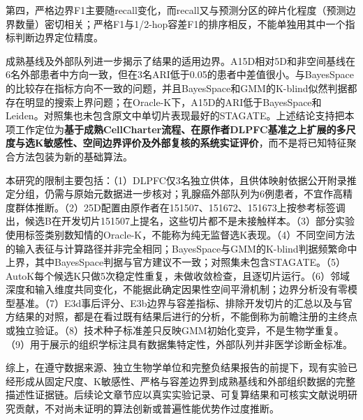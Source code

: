 第四，严格边界F1主要随recall变化，而recall又与预测分区的碎片化程度（预测边界数量）密切相关；严格F1与1/2-hop容差F1的排序相反，不能单独用其中一个指标判断边界定位精度。

成熟基线及外部队列进一步揭示了结果的适用边界。A15D相对5D和非空间基线在6名外部患者中方向一致，但在3名ARI低于0.05的患者中差值很小。与BayesSpace的比较存在指标方向不一致的问题，并且BayesSpace和GMM的K-blind似然判据都存在明显的搜索上界问题；在Oracle-K下，A15D的ARI低于BayesSpace和Leiden。对照集也未包含原文中单切片表现最好的STAGATE。上述结论支持把本项工作定位为\textbf{基于成熟CellCharter流程、在原作者DLPFC基准之上扩展的多尺度与选K敏感性、空间边界评价及外部复核的系统实证评价}，而不是将已知特征聚合方法包装为新的基础算法。

本研究的限制主要包括：（1）DLPFC仅3名独立供体，且供体映射依据公开附录推定分组，仍需与原始元数据进一步核对；乳腺癌外部队列为6例患者，不宜作高精度群体推断。（2）25D配置由原作者在151507、151672、151673上按参考标签调出，候选B在开发切片151507上提名，这些切片都不是未接触样本。（3）部分实验使用标签类别数知情的Oracle-K，不能称为纯无监督选K表现。（4）不同空间方法的输入表征与计算路径并非完全相同；BayesSpace与GMM的K-blind判据频繁命中上界，其中BayesSpace判据与官方建议不一致；对照集未包含STAGATE。（5）AutoK每个候选K只做5次稳定性重复，未做收敛检查，且逐切片运行。（6）邻域深度和输入维度共同变化，不能据此确定因果性空间平滑机制；边界分析没有零模型基准。（7）E3d事后评分、E3b边界与容差指标、排除开发切片的汇总以及与官方结果的对照，都是在看过既有结果后进行的分析，不能倒称为前瞻注册的主终点或独立验证。（8）技术种子标准差只反映GMM初始化变异，不是生物学重复。（9）用于展示的组织学标注具有数据集特定性，外部队列并非医学诊断金标准。

综上，在遵守数据来源、独立生物学单位和完整负结果报告的前提下，现有实验已经形成从固定尺度、K敏感性、严格与容差边界到成熟基线和外部组织数据的完整描述性证据链。后续论文章节应以真实实验记录、可复算结果和可核实文献说明研究贡献，不对尚未证明的算法创新或普遍性能优势作过度推断。

